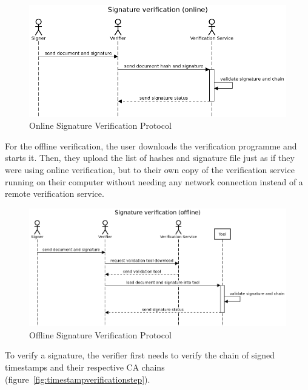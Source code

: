 \begin{figure}[H]
    \begin{center}
        \includegraphics[scale=0.5]{images/protocol_online_verification_high_level.png}
        \caption{Online Signature Verification Protocol}
        \label{fig:onlinesignatureverificationprotocol}
    \end{center}
\end{figure}

For the offline verification, the user downloads the verification programme and starts it.
Then, they upload the list of hashes and signature file just as if they were using online verification,
but to their own copy of the verification service running on their computer without needing any network connection
instead of a remote verification service.

\begin{figure}[H]
    \begin{center}
        \includegraphics[scale=0.5]{images/protocol_offline_verification_high_level.png}
        \caption{Offline Signature Verification Protocol}
        \label{fig:offlinesignatureverificationprotocol}
    \end{center}
\end{figure}
\pagebreak

To verify a signature, the verifier first needs to verify the chain of signed timestamps and their respective \gls{CA} chains (figure~\ref{fig:timestampverificationstep}).

